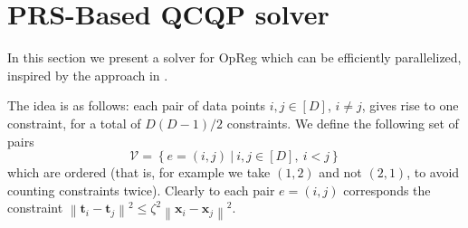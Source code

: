 \documentclass{article}
\newcommand{\norm}[1]{\left\lVert#1\right\rVert}
\newcommand{\tv}{\mathbold{t}}
\newcommand{\x}{\mathbold{x}}
\begin{document}








\appendix

\section{PRS-Based QCQP solver}
In this section we present a solver for OpReg which can be efficiently parallelized, inspired by the approach in \cite{simonetto_smooth_2021}.

The idea is as follows: each pair of data points $i, j \in [D]$, $i \neq j$, gives rise to one constraint, for a total of $D(D-1)/2$ constraints. We define the following set of pairs
$$
	\mathcal{V} = \left\{ e = (i,j) \ | \ i, j \in [D], \ i < j \right\}
$$
which are ordered (that is, for example we take $(1,2)$ and not $(2,1)$, to avoid counting constraints twice). Clearly to each pair $e = (i,j)$ corresponds the constraint $\norm{\tv_i - \tv_j}^2 \leq \zeta^2 \norm{\x_i - \x_j}^2$.
\end{document}
